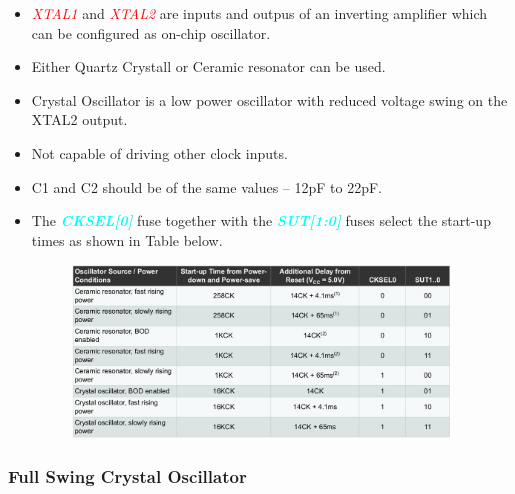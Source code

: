 \documentclass{article}
\newcommand{\bitFormat}[1]{\emph{\textbf{\textcolor{cyan}{#1}}}}
\newcommand{\pinFormat}[1]{\emph{\textcolor{red}{#1}}}
\begin{document}
\begin{itemize}
    \item \pinFormat{XTAL1} and \pinFormat{XTAL2} are inputs and outpus of an inverting amplifier which can be configured as on-chip oscillator.
    \item Either Quartz Crystall or Ceramic resonator can be used.
    \item Crystal Oscillator is a low power oscillator with reduced voltage swing on the XTAL2 output.
    \item Not capable of driving other clock inputs.
    \item C1 and C2 should be of the same values – 12pF to 22pF.
    \item The \bitFormat{CKSEL[0]} fuse together with the \bitFormat{SUT[1:0]} fuses select the start-up times as shown in Table below.
    \begin{figure}[H]
        \begin{center}
            \includegraphics[width=0.95\textwidth]{startUpTimesLowPowerCrystallOscillator.png}
        \end{center}
    \end{figure}
\end{itemize}

\subsubsection{Full Swing Crystal Oscillator}
\end{document}
